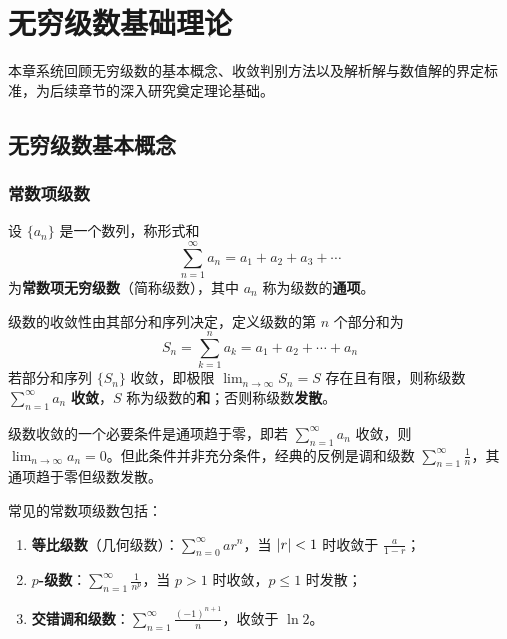 
\chapter{无穷级数基础理论}

本章系统回顾无穷级数的基本概念、收敛判别方法以及解析解与数值解的界定标准，为后续章节的深入研究奠定理论基础。

\section{无穷级数基本概念}

\subsection{常数项级数}

\begin{definition}
设 $\{a_n\}$ 是一个数列，称形式和
\begin{equation}
\sum_{n=1}^{\infty} a_n = a_1 + a_2 + a_3 + \cdots
\end{equation}
为\textbf{常数项无穷级数}（简称级数），其中 $a_n$ 称为级数的\textbf{通项}。
\end{definition}

级数的收敛性由其部分和序列决定，定义级数的第 $n$ 个部分和为
\begin{equation}
S_n = \sum_{k=1}^{n} a_k = a_1 + a_2 + \cdots + a_n
\end{equation}
若部分和序列 $\{S_n\}$ 收敛，即极限 $\displaystyle \lim_{n \to \infty} S_n = S$ 存在且有限，则称级数 $\displaystyle \sum_{n=1}^{\infty} a_n$ \textbf{收敛}，$S$ 称为级数的\textbf{和}；否则称级数\textbf{发散}。

级数收敛的一个必要条件是通项趋于零，即若 $\displaystyle \sum_{n=1}^{\infty} a_n$ 收敛，则 $\displaystyle \lim_{n \to \infty} a_n = 0$。但此条件并非充分条件，经典的反例是调和级数 $\displaystyle \sum_{n=1}^{\infty} \frac{1}{n}$，其通项趋于零但级数发散。

常见的常数项级数包括：
\begin{enumerate}[label=（\arabic*）]
  \item \textbf{等比级数}（几何级数）：$\displaystyle \sum_{n=0}^{\infty} ar^n$，当 $\left|r\right| < 1$ 时收敛于 $\frac{a}{1-r}$；
  \item \textbf{$p$-级数}：$\displaystyle \sum_{n=1}^{\infty} \frac{1}{n^p}$，当 $p > 1$ 时收敛，$p \leq 1$ 时发散；
  \item \textbf{交错调和级数}：$\displaystyle \sum_{n=1}^{\infty} \frac{(-1)^{n+1}}{n}$，收敛于 $\ln 2$。
\end{enumerate}

